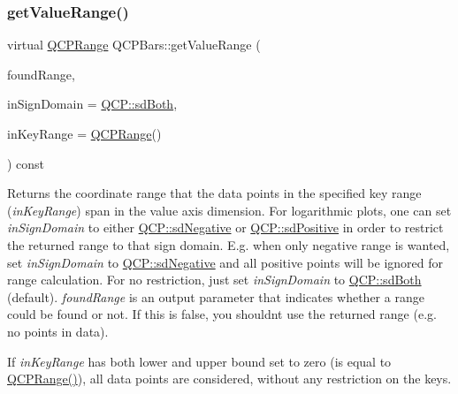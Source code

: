 \subsubsection{\texorpdfstring{get\+Value\+Range()}{getValueRange()}\hspace{0.1cm}{\footnotesize\ttfamily [1/2]}}
{\footnotesize\ttfamily virtual \hyperlink{class_q_c_p_range}{Q\+C\+P\+Range} Q\+C\+P\+Bars\+::get\+Value\+Range (\begin{DoxyParamCaption}\item[{bool \&}]{found\+Range,  }\item[{\hyperlink{namespace_q_c_p_afd50e7cf431af385614987d8553ff8a9}{Q\+C\+P\+::\+Sign\+Domain}}]{in\+Sign\+Domain = {\ttfamily \hyperlink{namespace_q_c_p_afd50e7cf431af385614987d8553ff8a9a3dee7e9cd2fedce9253b83e172626a6c}{Q\+C\+P\+::sd\+Both}},  }\item[{const \hyperlink{class_q_c_p_range}{Q\+C\+P\+Range} \&}]{in\+Key\+Range = {\ttfamily \hyperlink{class_q_c_p_range}{Q\+C\+P\+Range}()} }\end{DoxyParamCaption}) const\hspace{0.3cm}{\ttfamily [virtual]}}

Returns the coordinate range that the data points in the specified key range ({\itshape in\+Key\+Range}) span in the value axis dimension. For logarithmic plots, one can set {\itshape in\+Sign\+Domain} to either \hyperlink{namespace_q_c_p_afd50e7cf431af385614987d8553ff8a9a0b464fa3135be2808909739a969193c9}{Q\+C\+P\+::sd\+Negative} or \hyperlink{namespace_q_c_p_afd50e7cf431af385614987d8553ff8a9a23362334a52289677a51526a9b68db6c}{Q\+C\+P\+::sd\+Positive} in order to restrict the returned range to that sign domain. E.\+g. when only negative range is wanted, set {\itshape in\+Sign\+Domain} to \hyperlink{namespace_q_c_p_afd50e7cf431af385614987d8553ff8a9a0b464fa3135be2808909739a969193c9}{Q\+C\+P\+::sd\+Negative} and all positive points will be ignored for range calculation. For no restriction, just set {\itshape in\+Sign\+Domain} to \hyperlink{namespace_q_c_p_afd50e7cf431af385614987d8553ff8a9a3dee7e9cd2fedce9253b83e172626a6c}{Q\+C\+P\+::sd\+Both} (default). {\itshape found\+Range} is an output parameter that indicates whether a range could be found or not. If this is false, you shouldn\textquotesingle{}t use the returned range (e.\+g. no points in data).

If {\itshape in\+Key\+Range} has both lower and upper bound set to zero (is equal to {\ttfamily \hyperlink{class_q_c_p_range}{Q\+C\+P\+Range()}}), all data points are considered, without any restriction on the keys.

